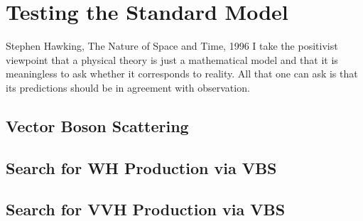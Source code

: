 \chapter{Testing the Standard Model}
\begin{aquote}{Stephen Hawking, The Nature of Space and Time, 1996}
    I take the positivist viewpoint that a physical theory is just a mathematical model and that it is meaningless to ask whether it corresponds to reality. 
    All that one can ask is that its predictions should be in agreement with observation. 
\end{aquote}
\section{Vector Boson Scattering}
\section{Search for WH Production via VBS}
\section{Search for VVH Production via VBS}
